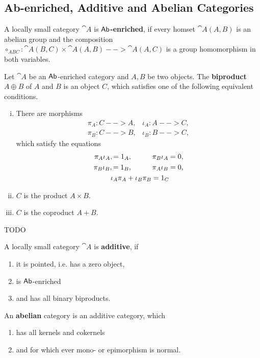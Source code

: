 	\subsection{Ab-enriched, Additive and Abelian Categories}

	\begin{definition}
		A locally small category $\cat{A}$ is \textbf{$\textsf{Ab}$-enriched}, if every homset $\cat{A}(A,B)$ is an abelian group and the composition $\circ_{ABC}: \cat{A}(B,C) \times \cat{A}(A,B) --> \cat{A}(A,C)$ is a group homomorphism in both variables.
	\end{definition}

	\begin{definition}[Biproduct]
		Let $\cat{A}$ be an $\textsf{Ab}$-enriched category and $A,B$ be two objects. The \textbf{biproduct} $A \oplus B$ of $A$ and $B$ is an object $C$, which satisfies one of the following equivalent conditions.
		\begin{enumerate}[(i)]
			\item{
				There are morphisms
				$$
					\begin{matrix}
						\pi_A:C-->A,&\iota_A:A-->C,\\
						\pi_B:C-->B,&\iota_B:B-->C,
					\end{matrix}
				$$
				which satisfy the equations
				\begin{align*}
					\pi_A\iota_A, = 1_A, \hspace{1cm}\pi_B\iota_A = 0,\\
					\pi_B\iota_B, = 1_B, \hspace{1cm}\pi_A\iota_B = 0,\\
					\iota_A\pi_A + \iota_B\pi_B = 1_C\hspace{.7cm}
				\end{align*}
			}
			\item{
				$C$ is the product $A \times B$.
			}
			\item{
				$C$ is the coproduct $A + B$.
			}
		\end{enumerate}
	\end{definition}
	\begin{sketch}
		TODO
	\end{sketch}

	\begin{definition}
		A locally small category $\cat{A}$ is \textbf{additive}, if
		\begin{enumerate}[$\circ$]
			\item{it is pointed, i.e. has a zero object,}
			\item{is $\textsf{Ab}$-enriched}
			\item{and has all binary biproducts.}
		\end{enumerate}

		An \textbf{abelian} category is an additive category, which
		\begin{enumerate}[$\circ$]
			\item{has all kernels and cokernels}
			\item{and for which ever mono- or epimorphism is normal.}
		\end{enumerate}
	\end{definition}


